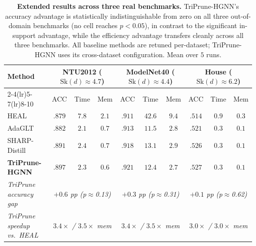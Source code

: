 \documentclass[10pt]{article}
\theoremstyle{plain}
\theoremstyle{definition}
\begin{document}
\begin{table}[ht!]
\centering
\caption{\textbf{Extended  results across three real benchmarks.} TriPrune-HGNN's accuracy advantage is statistically indistinguishable from zero on all three out-of-domain benchmarks (no cell reaches $p<0.05$), in contrast to the significant in-support advantage, while the efficiency advantage transfers cleanly across all three benchmarks. All baseline methods are retuned per-dataset; TriPrune-HGNN uses its cross-dataset configuration. Mean over $5$ runs.}
\label{tab:ModelNet40_Eva}
\setlength{\tabcolsep}{4pt}
\renewcommand{\arraystretch}{1.15}
\small
\begin{tabular}{l ccc ccc ccc}
\toprule
\multirow{2}{*}{\textbf{Method}}
& \multicolumn{3}{c}{\textbf{NTU2012} ($\mathrm{Sk}(d)\!\approx\!4.7$)}
& \multicolumn{3}{c}{\textbf{ModelNet40} ($\mathrm{Sk}(d)\!\approx\!4.4$)}
& \multicolumn{3}{c}{\textbf{House} ($\mathrm{Sk}(d)\!\approx\!6.2$)} \\
\cmidrule(lr){2-4}\cmidrule(lr){5-7}\cmidrule(lr){8-10}
& ACC & Time & Mem
& ACC & Time & Mem
& ACC & Time & Mem \\
\midrule
HEAL            & $.879$ & $7.8$  & $2.1$  & $.911$ & $42.6$ & $9.4$ & $.514$ & $0.9$ & $0.3$ \\  
AdaGLT          & $.882$ & $2.1$  & $0.7$  & $.913$ & $11.5$ & $2.8$ & $.521$ & $0.3$ & $0.1$ \\  
SHARP-Distill   & $.891$ & $2.4$  & $0.7$  & $.918$ & $13.1$ & $2.9$ & $.526$ & $0.3$ & $0.1$ \\  
\rowcolor{blue!10}
\textbf{TriPrune-HGNN}
                & $\mathbf{.897}$ & $\mathbf{2.3}$ & $\mathbf{0.6}$
                & $\mathbf{.921}$ & $\mathbf{12.4}$ & $\mathbf{2.7}$
                & $\mathbf{.527}$ & $\mathbf{0.3}$ & $\mathbf{0.1}$ \\   
\midrule
\textit{TriPrune accuracy gap} & \multicolumn{3}{c}{\textit{$+0.6$ pp (p$\approx$0.13)}}
                               & \multicolumn{3}{c}{\textit{$+0.3$ pp (p$\approx$0.31)}}   
                               & \multicolumn{3}{c}{\textit{$+0.1$ pp (p$\approx$0.62)}} \\ 
\textit{TriPrune speedup vs.\ HEAL} & \multicolumn{3}{c}{\textit{$3.4\times$ / $3.5\times$ mem}}
                                    & \multicolumn{3}{c}{\textit{$3.4\times$ / $3.5\times$ mem}}   
                                    & \multicolumn{3}{c}{\textit{$3.0\times$ / $3.0\times$ mem}} \\ 
\bottomrule
\end{tabular}
\end{table}
\end{document}
